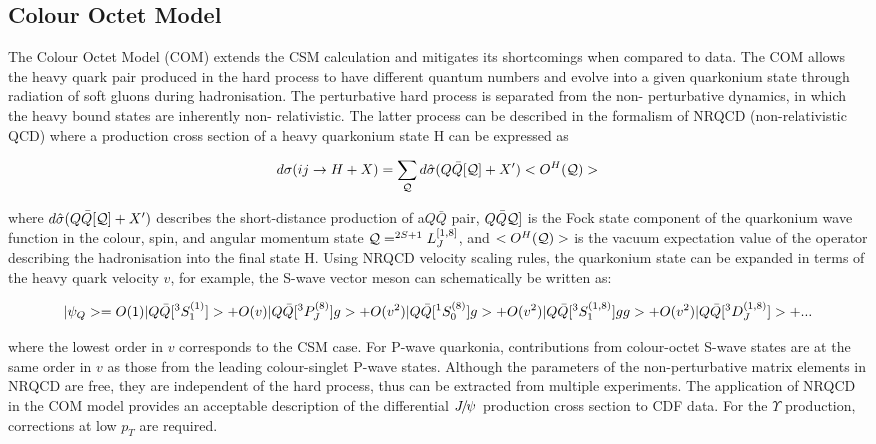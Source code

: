 \subsection{Colour Octet Model}

The Colour Octet Model (COM) \cite{COM} extends the CSM calculation and
mitigates its shortcomings when compared to data. The COM allows the heavy
quark pair produced in the hard process to have different quantum numbers and
evolve into a given quarkonium state through radiation of soft gluons during
hadronisation. The perturbative hard process is separated from the non-
perturbative dynamics, in which the heavy bound states are inherently non-
relativistic. The latter process can be described in the formalism of NRQCD
(non-relativistic QCD) where a production cross section of a heavy quarkonium
state H can be expressed as

\begin{equation}
d\sigma ( i j \rightarrow H + X ) = \sum_{\cal{Q}} d{\hat{\sigma}}(Q{\bar{Q}}[{\cal{Q}}] + X') 
<O^H({\cal{Q}})>
\end{equation}

\noindent where $d{\hat{\sigma}}(Q{\bar{Q}}[{\cal{Q}}] + X')$ describes the
short-distance production of a$Q{\bar{Q}}$ pair, $Q{\bar{Q}}{\cal{Q}}]$ is
the Fock state component of the quarkonium wave function in the colour, spin,
and angular momentum state ${\cal{Q}} =^{2S+1} L_J^{[1,8]}$, and
$<O^H({\cal{Q}})>$ is the vacuum expectation value of the operator describing
the hadronisation into the final state H. Using NRQCD velocity scaling rules,
the quarkonium state can be expanded in terms of the heavy quark velocity $v$,
for example, the S-wave vector meson can schematically be written as:

\begin{equation}
|\psi_Q> = O(1)|Q{\bar{Q}}[^3S_1^{(1)}]> + O(v)|Q{\bar{Q}}[^3P_J^{(8)}]g> + \\
O(v^2)|Q{\bar{Q}}[^1S_0^{(8)}]g> + \\
O(v^2)|Q{\bar{Q}}[^3S_1^{(1,8)}]gg> + O(v^2)|Q{\bar{Q}}[^3D_J^{(1,8)}]> + ...
\end{equation}   

\noindent where the lowest order in $v$ corresponds to the CSM case. For P-wave
quarkonia, contributions from colour-octet S-wave states are at the same order
in $v$ as those from the leading colour-singlet P-wave states. Although the
parameters of the non-perturbative matrix elements in NRQCD are free, they are
independent of the hard process, thus can be extracted from multiple
experiments. The application of NRQCD in the COM model provides an acceptable
description of the differential ${{J\mskip -3mu/\mskip -2mu\psi\mskip 2mu}}$ production cross section to CDF data.
For the $\Upsilon$ production, corrections at low $p_T$ are required.

